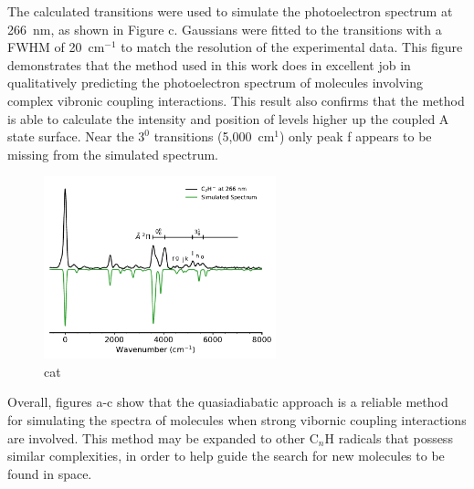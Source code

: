 \documentclass[journal=jpcafh,manuscript=article,layout=onecolumn, 12pt]{achemso}
\begin{document}
The calculated transitions were used to simulate the photoelectron spectrum at 266~nm, as shown in Figure c. Gaussians were fitted to the transitions with a FWHM of 20~cm$^{-1}$ to match the resolution of the experimental data. This figure demonstrates that the method used in this work does in excellent job in qualitatively predicting the photoelectron spectrum of molecules involving complex vibronic coupling interactions. This result also confirms that the method is able to calculate the intensity and position of levels higher up the coupled A state surface. Near the $3^0$ transitions (5,000~cm$^1$) only peak f appears to be missing from the simulated spectrum.

\begin{figure}[th!]
	\includegraphics[width=0.6\textwidth]{figures/266-plot.pdf}
	\caption{cat}
	\label{fig:266-plot}
\end{figure}

Overall, figures a-c show that the quasiadiabatic approach is a reliable method for simulating the spectra of molecules when strong vibornic coupling interactions are involved. This method may be expanded to other C$_n$H radicals that possess similar complexities, in order to help guide the search for new molecules to be found in space.
\end{document}
